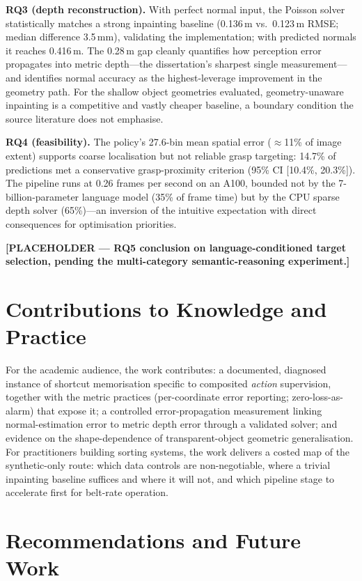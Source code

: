 \textbf{RQ3 (depth reconstruction).} With perfect normal input, the Poisson solver statistically matches a strong inpainting baseline (0.136\,m vs.\ 0.123\,m RMSE; median difference 3.5\,mm), validating the implementation; with predicted normals it reaches 0.416\,m. The 0.28\,m gap cleanly quantifies how perception error propagates into metric depth---the dissertation's sharpest single measurement---and identifies normal accuracy as the highest-leverage improvement in the geometry path. For the shallow object geometries evaluated, geometry-unaware inpainting is a competitive and vastly cheaper baseline, a boundary condition the source literature does not emphasise.

\textbf{RQ4 (feasibility).} The policy's 27.6-bin mean spatial error ($\approx$11\% of image extent) supports coarse localisation but not reliable grasp targeting: 14.7\% of predictions met a conservative grasp-proximity criterion (95\% CI [10.4\%, 20.3\%]). The pipeline runs at 0.26 frames per second on an A100, bounded not by the 7-billion-parameter language model (35\% of frame time) but by the CPU sparse depth solver (65\%)---an inversion of the intuitive expectation with direct consequences for optimisation priorities.

\textbf{[PLACEHOLDER --- RQ5 conclusion on language-conditioned target selection, pending the multi-category semantic-reasoning experiment.]}

\section{Contributions to Knowledge and Practice}
\label{sec:contributions_final}

For the academic audience, the work contributes: a documented, diagnosed instance of shortcut memorisation specific to composited \emph{action} supervision, together with the metric practices (per-coordinate error reporting; zero-loss-as-alarm) that expose it; a controlled error-propagation measurement linking normal-estimation error to metric depth error through a validated solver; and evidence on the shape-dependence of transparent-object geometric generalisation. For practitioners building sorting systems, the work delivers a costed map of the synthetic-only route: which data controls are non-negotiable, where a trivial inpainting baseline suffices and where it will not, and which pipeline stage to accelerate first for belt-rate operation.

\section{Recommendations and Future Work}
\label{sec:future_work}

